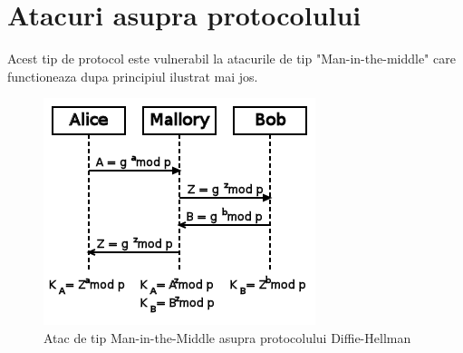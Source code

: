 \documentclass[12pt, a4paper, oneside, romanian]{teza-upb}
\begin{document}
\chapter{Atacuri asupra protocolului}
Acest tip de protocol este vulnerabil la atacurile de tip "Man-in-the-middle" care functioneaza dupa principiul ilustrat mai jos.
\begin{figure}[th]
\centering
\includegraphics*[scale=1]{img/dh-mitm.png}
\caption{Atac de tip Man-in-the-Middle asupra protocolului Diffie-Hellman}
\label{fig:punguta}
\end{figure}
\end{document}
